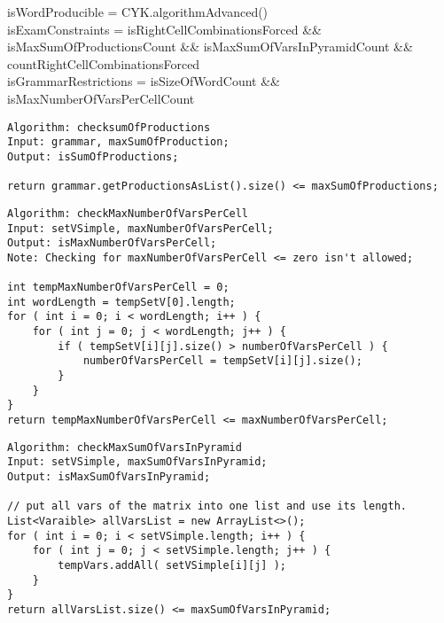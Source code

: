 \noindent  isWordProducible = CYK.algorithmAdvanced()\\

\noindent  isExamConstraints = isRightCellCombinationsForced \&\& isMaxSumOfProductionsCount \&\& isMaxSumOfVarsInPyramidCount \&\& countRightCellCombinationsForced \\

\noindent isGrammarRestrictions = isSizeOfWordCount \&\& isMaxNumberOfVarsPerCellCount \\

\lstset{language=java}
\begin{lstlisting}[frame=htrbl, caption={checksumOfProductions}, 
label={lst:checksumOfProductions}]
Algorithm: checksumOfProductions
Input: grammar, maxSumOfProduction;
Output: isSumOfProductions;

return grammar.getProductionsAsList().size() <= maxSumOfProductions; 
\end{lstlisting}

\lstset{language=java}
\begin{lstlisting}[frame=htrbl, caption={checkMaxNumberOfVarsPerCell}, 
label={lst:checkMaxNumberOfVarsPerCell}]
Algorithm: checkMaxNumberOfVarsPerCell
Input: setVSimple, maxNumberOfVarsPerCell;
Output: isMaxNumberOfVarsPerCell;
Note: Checking for maxNumberOfVarsPerCell <= zero isn't allowed;

int tempMaxNumberOfVarsPerCell = 0;
int wordLength = tempSetV[0].length;
for ( int i = 0; i < wordLength; i++ ) {
	for ( int j = 0; j < wordLength; j++ ) {
		if ( tempSetV[i][j].size() > numberOfVarsPerCell ) {
			numberOfVarsPerCell = tempSetV[i][j].size();
		}
	}
}
return tempMaxNumberOfVarsPerCell <= maxNumberOfVarsPerCell;
\end{lstlisting}

\pagebreak

\lstset{language=java}
\begin{lstlisting}[frame=htrbl, caption={checkMaxSumOfVarsInPyramid}, 
label={lst:checkMaxSumOfVarsInPyramid}]
Algorithm: checkMaxSumOfVarsInPyramid
Input: setVSimple, maxSumOfVarsInPyramid;
Output: isMaxSumOfVarsInPyramid;

// put all vars of the matrix into one list and use its length.
List<Varaible> allVarsList = new ArrayList<>();
for ( int i = 0; i < setVSimple.length; i++ ) {
	for ( int j = 0; j < setVSimple.length; j++ ) {
		tempVars.addAll( setVSimple[i][j] );
	}
}
return allVarsList.size() <= maxSumOfVarsInPyramid; 
\end{lstlisting}

